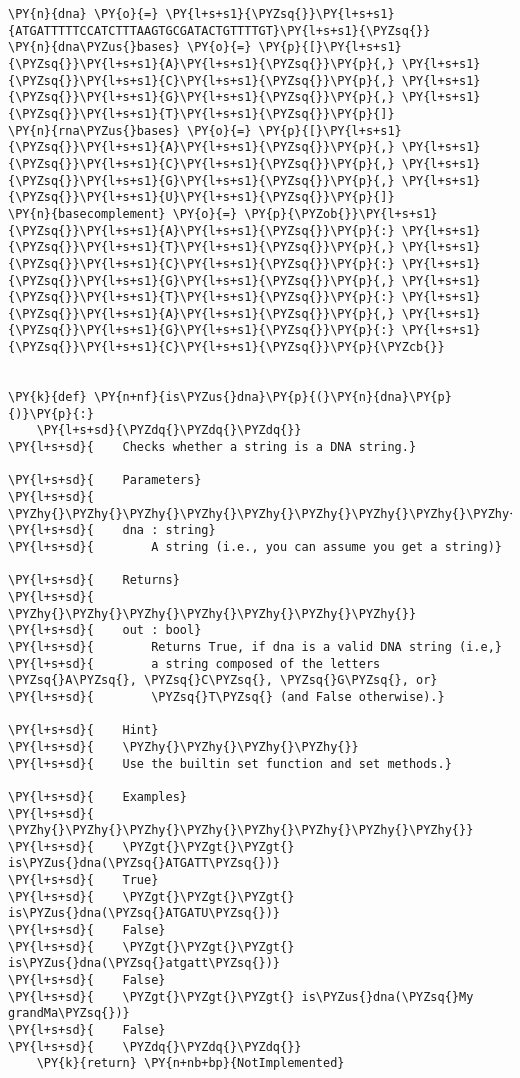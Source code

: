 \begin{Verbatim}[commandchars=\\\{\}]
\PY{n}{dna} \PY{o}{=} \PY{l+s+s1}{\PYZsq{}}\PY{l+s+s1}{ATGATTTTTCCATCTTTAAGTGCGATACTGTTTTGT}\PY{l+s+s1}{\PYZsq{}}
\PY{n}{dna\PYZus{}bases} \PY{o}{=} \PY{p}{[}\PY{l+s+s1}{\PYZsq{}}\PY{l+s+s1}{A}\PY{l+s+s1}{\PYZsq{}}\PY{p}{,} \PY{l+s+s1}{\PYZsq{}}\PY{l+s+s1}{C}\PY{l+s+s1}{\PYZsq{}}\PY{p}{,} \PY{l+s+s1}{\PYZsq{}}\PY{l+s+s1}{G}\PY{l+s+s1}{\PYZsq{}}\PY{p}{,} \PY{l+s+s1}{\PYZsq{}}\PY{l+s+s1}{T}\PY{l+s+s1}{\PYZsq{}}\PY{p}{]}
\PY{n}{rna\PYZus{}bases} \PY{o}{=} \PY{p}{[}\PY{l+s+s1}{\PYZsq{}}\PY{l+s+s1}{A}\PY{l+s+s1}{\PYZsq{}}\PY{p}{,} \PY{l+s+s1}{\PYZsq{}}\PY{l+s+s1}{C}\PY{l+s+s1}{\PYZsq{}}\PY{p}{,} \PY{l+s+s1}{\PYZsq{}}\PY{l+s+s1}{G}\PY{l+s+s1}{\PYZsq{}}\PY{p}{,} \PY{l+s+s1}{\PYZsq{}}\PY{l+s+s1}{U}\PY{l+s+s1}{\PYZsq{}}\PY{p}{]}
\PY{n}{basecomplement} \PY{o}{=} \PY{p}{\PYZob{}}\PY{l+s+s1}{\PYZsq{}}\PY{l+s+s1}{A}\PY{l+s+s1}{\PYZsq{}}\PY{p}{:} \PY{l+s+s1}{\PYZsq{}}\PY{l+s+s1}{T}\PY{l+s+s1}{\PYZsq{}}\PY{p}{,} \PY{l+s+s1}{\PYZsq{}}\PY{l+s+s1}{C}\PY{l+s+s1}{\PYZsq{}}\PY{p}{:} \PY{l+s+s1}{\PYZsq{}}\PY{l+s+s1}{G}\PY{l+s+s1}{\PYZsq{}}\PY{p}{,} \PY{l+s+s1}{\PYZsq{}}\PY{l+s+s1}{T}\PY{l+s+s1}{\PYZsq{}}\PY{p}{:} \PY{l+s+s1}{\PYZsq{}}\PY{l+s+s1}{A}\PY{l+s+s1}{\PYZsq{}}\PY{p}{,} \PY{l+s+s1}{\PYZsq{}}\PY{l+s+s1}{G}\PY{l+s+s1}{\PYZsq{}}\PY{p}{:} \PY{l+s+s1}{\PYZsq{}}\PY{l+s+s1}{C}\PY{l+s+s1}{\PYZsq{}}\PY{p}{\PYZcb{}}


\PY{k}{def} \PY{n+nf}{is\PYZus{}dna}\PY{p}{(}\PY{n}{dna}\PY{p}{)}\PY{p}{:}
    \PY{l+s+sd}{\PYZdq{}\PYZdq{}\PYZdq{}}
\PY{l+s+sd}{    Checks whether a string is a DNA string.}

\PY{l+s+sd}{    Parameters}
\PY{l+s+sd}{    \PYZhy{}\PYZhy{}\PYZhy{}\PYZhy{}\PYZhy{}\PYZhy{}\PYZhy{}\PYZhy{}\PYZhy{}\PYZhy{}}
\PY{l+s+sd}{    dna : string}
\PY{l+s+sd}{        A string (i.e., you can assume you get a string)}

\PY{l+s+sd}{    Returns}
\PY{l+s+sd}{    \PYZhy{}\PYZhy{}\PYZhy{}\PYZhy{}\PYZhy{}\PYZhy{}\PYZhy{}}
\PY{l+s+sd}{    out : bool}
\PY{l+s+sd}{        Returns True, if dna is a valid DNA string (i.e,}
\PY{l+s+sd}{        a string composed of the letters \PYZsq{}A\PYZsq{}, \PYZsq{}C\PYZsq{}, \PYZsq{}G\PYZsq{}, or}
\PY{l+s+sd}{        \PYZsq{}T\PYZsq{} (and False otherwise).}

\PY{l+s+sd}{    Hint}
\PY{l+s+sd}{    \PYZhy{}\PYZhy{}\PYZhy{}\PYZhy{}}
\PY{l+s+sd}{    Use the builtin set function and set methods.}

\PY{l+s+sd}{    Examples}
\PY{l+s+sd}{    \PYZhy{}\PYZhy{}\PYZhy{}\PYZhy{}\PYZhy{}\PYZhy{}\PYZhy{}\PYZhy{}}
\PY{l+s+sd}{    \PYZgt{}\PYZgt{}\PYZgt{} is\PYZus{}dna(\PYZsq{}ATGATT\PYZsq{})}
\PY{l+s+sd}{    True}
\PY{l+s+sd}{    \PYZgt{}\PYZgt{}\PYZgt{} is\PYZus{}dna(\PYZsq{}ATGATU\PYZsq{})}
\PY{l+s+sd}{    False}
\PY{l+s+sd}{    \PYZgt{}\PYZgt{}\PYZgt{} is\PYZus{}dna(\PYZsq{}atgatt\PYZsq{})}
\PY{l+s+sd}{    False}
\PY{l+s+sd}{    \PYZgt{}\PYZgt{}\PYZgt{} is\PYZus{}dna(\PYZsq{}My grandMa\PYZsq{})}
\PY{l+s+sd}{    False}
\PY{l+s+sd}{    \PYZdq{}\PYZdq{}\PYZdq{}}
    \PY{k}{return} \PY{n+nb+bp}{NotImplemented}
\end{Verbatim}
